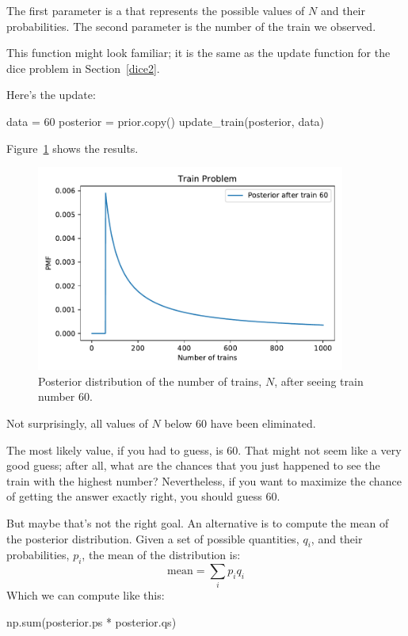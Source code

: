 \documentclass[12pt]{book}
\theoremstyle{exercise}
\begin{document}
The first parameter is a  that represents the possible values of $N$ and their probabilities.
The second parameter is the number of the train we observed.

This function might look familiar; it is the same as the update function for the dice problem in Section~\ref{dice2}.


Here's the update:

\begin{code}
data = 60
posterior = prior.copy()
update_train(posterior, data)
\end{code}

Figure~\ref{fig04-01} shows the results.
 
\begin{figure}
\centerline{\includegraphics[width=4in]{figs/fig04-01.pdf}}
\caption{Posterior distribution of the number of trains, $N$, after seeing train number 60.}
\label{fig04-01}
\end{figure}

Not surprisingly, all values of $N$ below 60 have been eliminated.

The most likely value, if you had to guess, is 60.  
That might not seem like a very good guess; after all, what are the chances that you just happened to see the train with the highest number?
Nevertheless, if you want to maximize the chance of getting
the answer exactly right, you should guess 60.

But maybe that's not the right goal.  
An alternative is to compute the mean of the posterior distribution.
Given a set of possible quantities, $q_i$, and their probabilities, $p_i$, the mean of the distribution is:
%
\[ \mathrm{mean} = \sum_i p_i q_i \]
%
Which we can compute like this:

\begin{code}
np.sum(posterior.ps * posterior.qs)
\end{code}
\end{document}
